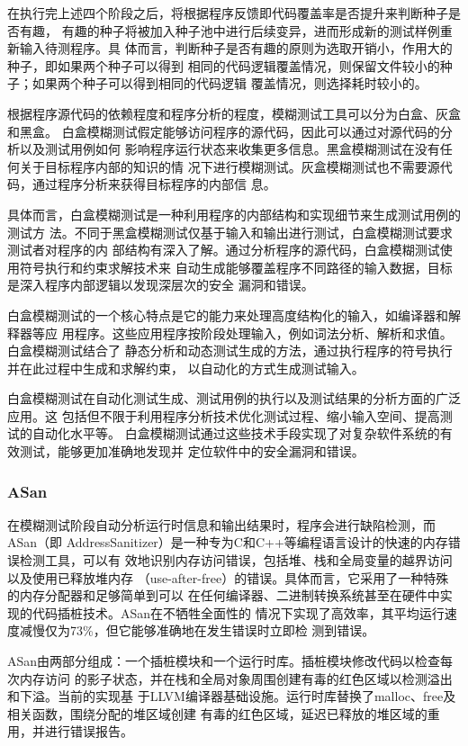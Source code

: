 在执行完上述四个阶段之后，将根据程序反馈即代码覆盖率是否提升来判断种子是否有趣，
有趣的种子将被加入种子池中进行后续变异，进而形成新的测试样例重新输入待测程序。具
体而言，判断种子是否有趣的原则为选取开销小，作用大的种子，即如果两个种子可以得到
相同的代码逻辑覆盖情况，则保留文件较小的种子；如果两个种子可以得到相同的代码逻辑
覆盖情况，则选择耗时较小的。

根据程序源代码的依赖程度和程序分析的程度，模糊测试工具可以分为白盒、灰盒和黑盒。
白盒模糊测试假定能够访问程序的源代码，因此可以通过对源代码的分析以及测试用例如何
影响程序运行状态来收集更多信息。黑盒模糊测试在没有任何关于目标程序内部的知识的情
况下进行模糊测试。灰盒模糊测试也不需要源代码，通过程序分析来获得目标程序的内部信
息。

具体而言，白盒模糊测试是一种利用程序的内部结构和实现细节来生成测试用例的测试方
法。不同于黑盒模糊测试仅基于输入和输出进行测试，白盒模糊测试要求测试者对程序的内
部结构有深入了解。通过分析程序的源代码，白盒模糊测试使用符号执行和约束求解技术来
自动生成能够覆盖程序不同路径的输入数据，目标是深入程序内部逻辑以发现深层次的安全
漏洞和错误。

白盒模糊测试的一个核心特点是它的能力来处理高度结构化的输入，如编译器和解释器等应
用程序。这些应用程序按阶段处理输入，例如词法分析、解析和求值。白盒模糊测试结合了
静态分析和动态测试生成的方法，通过执行程序的符号执行并在此过程中生成和求解约束，
以自动化的方式生成测试输入。

白盒模糊测试在自动化测试生成、测试用例的执行以及测试结果的分析方面的广泛应用。这
包括但不限于利用程序分析技术优化测试过程、缩小输入空间、提高测试的自动化水平等。
白盒模糊测试通过这些技术手段实现了对复杂软件系统的有效测试，能够更加准确地发现并
定位软件中的安全漏洞和错误。

\subsubsection{ASan}

在模糊测试阶段自动分析运行时信息和输出结果时，程序会进行缺陷检测，而ASan（即
AddressSanitizer）是一种专为C和C++等编程语言设计的快速的内存错误检测工具，可以有
效地识别内存访问错误，包括堆、栈和全局变量的越界访问以及使用已释放堆内存
（use-after-free）的错误。具体而言，它采用了一种特殊的内存分配器和足够简单到可以
在任何编译器、二进制转换系统甚至在硬件中实现的代码插桩技术。ASan在不牺牲全面性的
情况下实现了高效率，其平均运行速度减慢仅为73\%，但它能够准确地在发生错误时立即检
测到错误。

ASan由两部分组成：一个插桩模块和一个运行时库。插桩模块修改代码以检查每次内存访问
的影子状态，并在栈和全局对象周围创建有毒的红色区域以检测溢出和下溢。当前的实现基
于LLVM编译器基础设施。运行时库替换了malloc、free及相关函数，围绕分配的堆区域创建
有毒的红色区域，延迟已释放的堆区域的重用，并进行错误报告。

